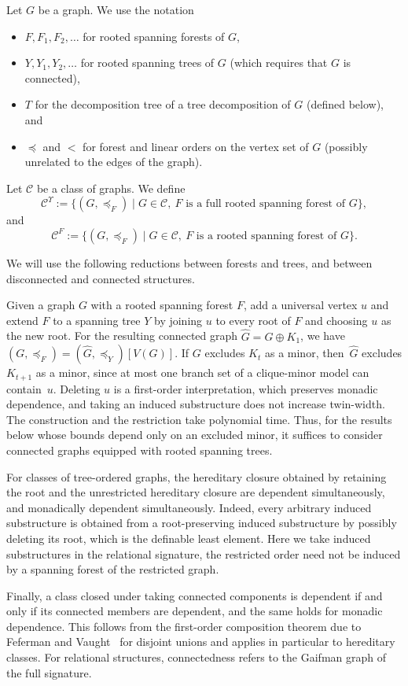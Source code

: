\documentclass[1p,number,11pt]{elsarticle}
\theoremstyle{plain}
\newcommand{\Cc}{\mathscr{C}}
\begin{document}
\smallskip
Let $G$ be a graph.
We use the notation
\begin{itemize}
    \item $F,F_1,F_2,\dots$ for rooted spanning forests of $G$,
    \item $Y,Y_1,Y_2,\dots$ for rooted spanning trees of $G$ (which requires that $G$ is connected),
    \item $T$ for the decomposition tree of a tree decomposition of $G$ (defined below), and 
    \item $\preceq$ and $<$ for forest and linear orders on the vertex set of $G$ (possibly unrelated to the edges of the graph).
\end{itemize}
 
Let $\Cc$ be a class of graphs.
We define
\[
\Cc^\Upsilon
:=
\bigl\{
(G,\preceq_F)\;\big|\;
G\in\Cc,\ 
F \text{ is a full rooted spanning forest of } G
\bigr\},
\]
and 
\[
\Cc^{F}
:=
\bigl\{
(G,\preceq_F)\;\big|\;
G\in\Cc,\ 
F \text{ is a rooted spanning forest of } G
\bigr\}.
\]


\begin{remark}\label{rem:forest-tree-reduction}
We will use the following reductions between forests and trees, and between disconnected and connected structures.

Given a graph $G$ with a rooted spanning forest $F$, add a universal vertex $u$ and extend $F$ to a spanning tree $Y$ by joining $u$ to every root of $F$ and choosing $u$ as the new root.
For the resulting connected graph $\widehat G=G\oplus K_1$, we have
$(G,\preceq_F)=(\widehat G,\preceq_Y)[V(G)]$.
If $G$ excludes $K_t$ as a minor, then~$\widehat G$ excludes $K_{t+1}$ as a minor, since at most one branch set of a clique-minor model can contain~$u$.
Deleting $u$ is a first-order interpretation, which preserves monadic dependence, and taking an induced substructure does not increase twin-width.
The construction and the restriction take polynomial time.
Thus, for the results below whose bounds depend only on an excluded minor, it suffices to consider connected graphs equipped with rooted spanning trees.

For classes of tree-ordered graphs, the hereditary closure obtained by retaining the root and the unrestricted hereditary closure are dependent simultaneously, and monadically dependent simultaneously.
Indeed, every arbitrary induced substructure is obtained from a root-preserving induced substructure by possibly deleting its root, which is the definable least element.
Here we take induced substructures in the relational signature, the restricted order need not be induced by a spanning forest of the restricted graph.

Finally, a class closed under taking connected components is dependent if and only if its connected members are dependent, and the same holds for monadic dependence.
This follows from the first-order composition theorem due to Feferman and Vaught~\cite{feferman1959first} for disjoint unions and applies in particular to hereditary classes.
For relational structures, connectedness refers to the Gaifman graph of the full signature.
\end{remark}
\end{document}
